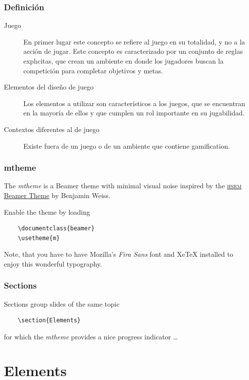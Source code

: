 \documentclass[10pt, compress]{beamer}
\begin{document}
\begin{frame}
\frametitle{Definición}

\begin{description}
 \item[Juego] En primer lugar este concepto se refiere al juego en su totalidad, y no a la acción de jugar. 
Este concepto es caracterizado por un conjunto de reglas explıcitas, que crean un ambiente en donde los 
jugadores buscan la competición para completar objetivos y metas.
 \item[Elementos del diseño de juego] Los elementos a utilizar son característicos a los juegos, que se 
encuentran en la mayoría de ellos y que cumplen un rol importante en su jugabilidad.
 \item[Contextos diferentes al de juego] Existe fuera de un juego o de un ambiente que contiene gamification.
\end{description}
\end{frame}

\begin{frame}[fragile]
  \frametitle{mtheme}

  The \emph{mtheme} is a Beamer theme with minimal visual noise inspired by the
  \href{https://github.com/hsrmbeamertheme/hsrmbeamertheme}{\textsc{hsrm} Beamer
  Theme} by Benjamin Weiss.

  Enable the theme by loading

  \begin{verbatim}
    \documentclass{beamer}
    \usetheme{m}
  \end{verbatim}

  Note, that you have to have Mozilla's \emph{Fira Sans} font and XeTeX
  installed to enjoy this wonderful typography.
\end{frame}

\begin{frame}[fragile]
  \frametitle{Sections}
  Sections group slides of the same topic

  \begin{verbatim}
    \section{Elements}
  \end{verbatim}

  for which the \emph{mtheme} provides a nice progress indicator \ldots
\end{frame}

\section{Elements}
\end{document}
